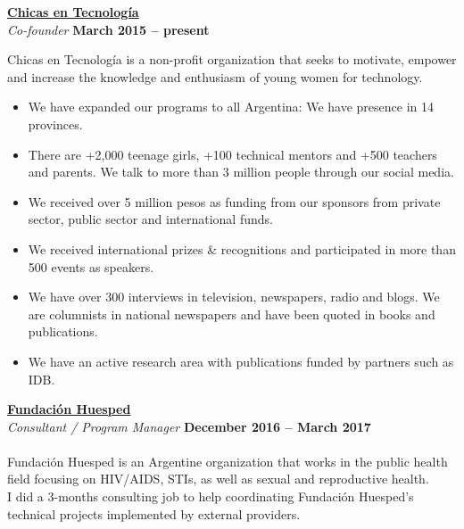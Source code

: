 \documentclass[margin,line]{resume}
\begin{document}
\begin{resume}
\textbf{\href{http://www.chicasentecnologia.org/}{Chicas en Tecnolog\'ia}}\\\vspace{1mm}
\textsl{Co-founder} \hfill \textbf{March 2015 -- present}\vspace{-3mm}\\\vspace{-1mm}

Chicas en Tecnolog\'ia is a non-profit organization that seeks to motivate, empower and increase the knowledge and enthusiasm of young women for technology.

\begin{itemize}

\item We have expanded our programs to all Argentina: We have presence in 14 provinces.

\item There are +2,000 teenage girls,  +100 technical mentors and +500 teachers and parents. We talk to more than 3 million people through our social media.

\item We received over 5 million pesos as funding from our sponsors from private sector, public sector and international funds.

\item We received international prizes \& recognitions and participated in more than 500 events as speakers. 

\item We have over 300 interviews in television, newspapers, radio and blogs. We are columnists in national newspapers and have been quoted in books and publications.

\item We have an active research area with publications funded by partners such as IDB.

\end{itemize}

\vspace{-5mm}
\textbf{\href{https://www.huesped.org.ar/}{Fundaci\'on Huesped}}\\\vspace{1mm}
\textsl{Consultant / Program Manager} \hfill \textbf{December 2016 -- March 2017}\vspace{-3mm}\\\vspace{-1mm}
\\
Fundaci\'on Huesped is an Argentine organization that works in the public health field focusing on HIV/AIDS, STIs, as well as sexual and reproductive health.
\\
I did a 3-months consulting job to help coordinating Fundaci\'on Huesped's technical projects implemented by external providers.



\end{resume}
\end{document}
